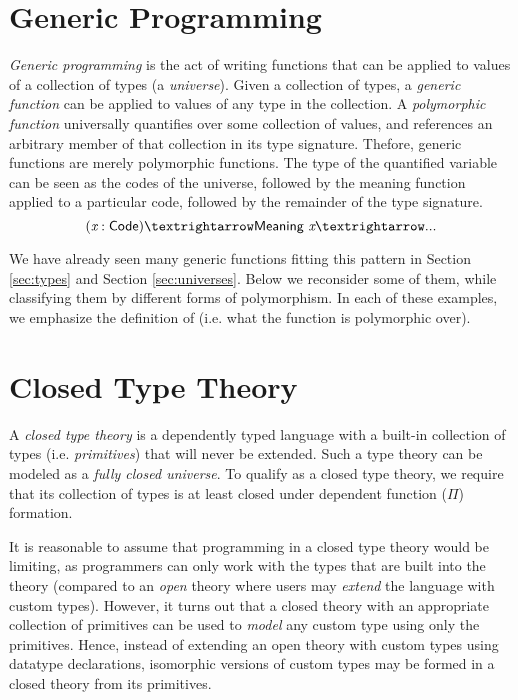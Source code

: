 \documentclass[12pt]{report}
\newcommand{\refsec}[1]{Section \ref{sec:#1}}
\newcommand{\AgdaData}[1]{\AgdaDatatype{#1}}
\newcommand{\AgdaFun}[1]{\AgdaFunction{#1}}
\newcommand{\AgdaVar}[1]{\AgdaBound{#1}}
\theoremstyle{definition}
\theoremstyle{remark}
\numberwithin{definition}{section}
\numberwithin{equation}{section}
\numberwithin{proposition}{section}
\numberwithin{conjecture}{section}
\numberwithin{theorem}{section}
\numberwithin{lemma}{section}
\numberwithin{corollary}{section}
\numberwithin{example}{section}
\numberwithin{remark}{section}
\begin{document}



\chapter{Generic Programming}\label{ch:generic}

\textit{Generic programming} is the act of writing
functions that can be applied to values of a collection of types
(a \textit{universe}).
Given a collection of types, a \textit{generic function} can be
applied to values of any type in the collection. A
\textit{polymorphic function} universally
quantifies over some collection of values, and references an arbitrary
member of that collection in its type signature. Thefore, generic
functions are merely polymorphic functions.
The type of the quantified variable can be seen as the codes of the
universe, followed by the meaning function applied to a particular
code, followed by the remainder of the type signature.
$$
(\AgdaVar{x} : \AgdaData{Code}) → \AgdaFun{Meaning}~\AgdaVar{x} → ...
$$

We have already seen many generic functions fitting this pattern in
\refsec{types} and \refsec{universes}. Below we reconsider some of
them, while classifying them by different forms of polymorphism. In
each of these examples, we emphasize the definition of
\AgdaFun{Code} (i.e. what the function is polymorphic over).






\chapter{Closed Type Theory}\label{ch:closedtt}

A \textit{closed type theory} is a dependently typed language with a
built-in collection of types
(i.e. \textit{primitives}) that will never be extended.
Such a type
theory can be modeled as a \textit{fully closed universe}. To qualify
as a closed type theory, we require that its collection of types is at
least closed under dependent function ($\Pi$) formation.

It is reasonable to assume that programming in a closed type theory
would be limiting, as programmers can only work with the types that
are built into the theory (compared to an \textit{open} theory where
users may \textit{extend} the language with custom types).
However, it turns out that a closed theory with an appropriate
collection of primitives can be used to \textit{model} any custom type
using only the primitives. Hence, instead of extending an open theory
with custom types using datatype declarations,
isomorphic versions of custom types
may be formed in a closed theory from its primitives.
\end{document}
